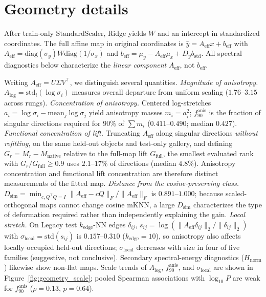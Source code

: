 \documentclass{article}
\begin{document}
\section{Geometry details}\label{app:geometry}

After train-only \(\mathrm{StandardScaler}\), Ridge yields \(W\) and an intercept in standardized coordinates.
The full affine map in original coordinates is \(\hat y=A_{\mathrm{eff}}x+b_{\mathrm{eff}}\) with
\(A_{\mathrm{eff}}=\mathrm{diag}(\sigma_y)W\mathrm{diag}(1/\sigma_x)\) and
\(b_{\mathrm{eff}}=\mu_y-A_{\mathrm{eff}}\mu_x+D_y b_{\mathrm{std}}\).
All spectral diagnostics below characterize the \emph{linear component} \(A_{\mathrm{eff}}\), not \(b_{\mathrm{eff}}\).

Writing \(A_{\mathrm{eff}}=U\Sigma V^\top\), we distinguish several quantities.
\emph{Magnitude of anisotropy.}
\(A_{\log}=\mathrm{std}_i(\log\sigma_i)\) measures overall departure from uniform scaling (\(1.76\)--\(3.15\) across rungs).
\emph{Concentration of anisotropy.}
Centered log-stretches \(a_i=\log\sigma_i-\mathrm{mean}_j\log\sigma_j\) yield anisotropy masses \(m_i=a_i^2\);
\(f_{90}^{\mathrm{anis}}\) is the fraction of singular directions required for \(90\%\) of \(\sum m_i\)
(\(0.411\)--\(0.490\); median \(0.427\)).
\emph{Functional concentration of lift.}
Truncating \(A_{\mathrm{eff}}\) along singular directions \emph{without refitting}, on the same held-out objects and test-only gallery, and defining
\(G_r=M_r-M_{\mathrm{native}}\) relative to the full-map lift \(G_{\mathrm{full}}\),
the smallest evaluated rank with \(G_r/G_{\mathrm{full}}\ge0.9\) uses
\(2.1\)--\(17\%\) of directions (median \(4.8\%\)).
Anisotropy concentration and functional lift concentration are therefore distinct measurements of the fitted map.
\emph{Distance from the cosine-preserving class.}
\(D_{\mathrm{sim}}=\min_{c,Q^\top Q=I}\|A_{\mathrm{eff}}-cQ\|_F/\|A_{\mathrm{eff}}\|_F\) is \(0.891\)--\(1.000\);
because scaled-orthogonal maps cannot change cosine mKNN, a large \(D_{\mathrm{sim}}\) characterizes the type of deformation required rather than independently explaining the gain.
\emph{Local stretch.}
On Legacy test \(k_{\mathrm{edge}}\)-NN edges \(\delta_{ij}\),
\(s_{ij}=\log(\|A_{\mathrm{eff}}\delta_{ij}\|_2/\|\delta_{ij}\|_2)\) with \(\sigma_{\mathrm{local}}=\mathrm{std}(s_{ij})\)
is \(0.157\)--\(0.310\) (\(k_{\mathrm{edge}}{=}10\)), so anisotropy also affects locally occupied held-out directions; \(\sigma_{\mathrm{local}}\) decreases with size in four of five families (suggestive, not conclusive).
Secondary spectral-energy diagnostics (\(H_{\mathrm{norm}}\)) likewise show non-flat maps.
Scale trends of \(A_{\log}\), \(f_{90}^{\mathrm{anis}}\), and \(\sigma_{\mathrm{local}}\) are shown in Figure~\ref{fig:geometry_scale};
pooled Spearman associations with \(\log_{10}P\) are weak for \(f_{90}^{\mathrm{anis}}\) (\(\rho{=}0.13\), \(p{=}0.64\)).
\end{document}
